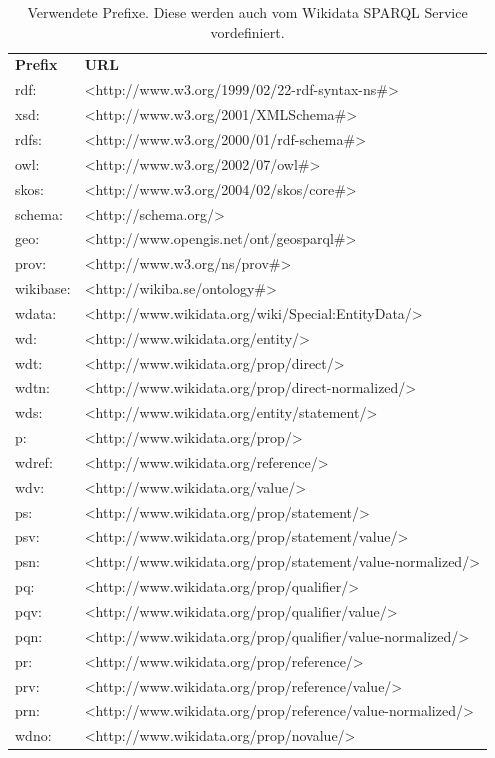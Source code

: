 \begin{table}
\begin{tabular}{l l}
\bfseries{Prefix} & \bfseries{URL} \\
rdf: & <http://www.w3.org/1999/02/22-rdf-syntax-ns\#> \\
xsd: & <http://www.w3.org/2001/XMLSchema\#> \\
rdfs: & <http://www.w3.org/2000/01/rdf-schema\#> \\
owl: & <http://www.w3.org/2002/07/owl\#> \\
skos: & <http://www.w3.org/2004/02/skos/core\#> \\
schema: & <http://schema.org/> \\
geo: & <http://www.opengis.net/ont/geosparql\#> \\
prov: & <http://www.w3.org/ns/prov\#> \\
wikibase: & <http://wikiba.se/ontology\#> \\
wdata: & <http://www.wikidata.org/wiki/Special:EntityData/> \\
wd: & <http://www.wikidata.org/entity/> \\
wdt: & <http://www.wikidata.org/prop/direct/> \\
wdtn: & <http://www.wikidata.org/prop/direct-normalized/> \\
wds: & <http://www.wikidata.org/entity/statement/> \\
p: & <http://www.wikidata.org/prop/> \\
wdref: & <http://www.wikidata.org/reference/> \\
wdv: & <http://www.wikidata.org/value/> \\
ps: & <http://www.wikidata.org/prop/statement/> \\
psv: & <http://www.wikidata.org/prop/statement/value/> \\
psn: & <http://www.wikidata.org/prop/statement/value-normalized/> \\
pq: & <http://www.wikidata.org/prop/qualifier/> \\
pqv: & <http://www.wikidata.org/prop/qualifier/value/> \\
pqn: & <http://www.wikidata.org/prop/qualifier/value-normalized/> \\
pr: & <http://www.wikidata.org/prop/reference/> \\
prv: & <http://www.wikidata.org/prop/reference/value/> \\
prn: & <http://www.wikidata.org/prop/reference/value-normalized/> \\
wdno: & <http://www.wikidata.org/prop/novalue/>
\end{tabular}
\caption{Verwendete Prefixe. Diese werden auch vom Wikidata SPARQL Service vordefiniert.}
\end{table}

